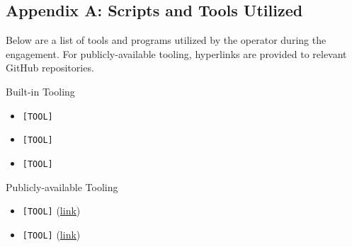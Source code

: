 \documentclass[
]{article}
\providecommand{\tightlist}{%
  \setlength{\itemsep}{0pt}\setlength{\parskip}{0pt}}
\begin{document}
\lipsum[1]

\lipsum[2]
\pagebreak

\subsection{Appendix A: Scripts and Tools
Utilized}\label{appendix-a-scripts-and-tools-utilized}

Below are a list of tools and programs utilized by the operator during
the engagement. For publicly-available tooling, hyperlinks are provided
to relevant GitHub repositories.

Built-in Tooling

\begin{itemize}
\tightlist
\item
  \texttt{[TOOL]}
\item
  \texttt{[TOOL]}
\item
  \texttt{[TOOL]}
\end{itemize}

Publicly-available Tooling

\begin{itemize}
\tightlist
\item
  \texttt{[TOOL]} (\href{http://your/link/here}{\underline{link}})
\item
  \texttt{[TOOL]} (\href{http://your/link/here}{\underline{link}})

\end{itemize}
\end{document}

